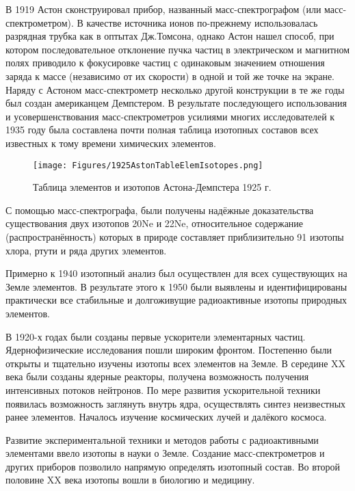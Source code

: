 \documentclass[a5paper,openany]{book}
\begin{document}
		В 1919 Астон сконструировал прибор, названный масс-спектрографом (или масс-спектрометром). В качестве источника ионов по-прежнему использовалась разрядная трубка как в оптытах Дж.Томсона, однако
		Астон нашел способ, при котором последовательное отклонение пучка частиц в электрическом и
		магнитном полях приводило к фокусировке частиц с одинаковым значением отношения заряда к массе
		(независимо от их скорости) в одной и той же точке на экране. Наряду с Астоном масс-спектрометр
		несколько другой конструкции в те же годы был создан американцем Демпстером. В результате
		последующего использования и усовершенствования масс-спектрометров усилиями многих
		исследователей к 1935 году была составлена почти полная таблица изотопных составов всех известных
		к тому времени химических элементов.
		
		\begin{figure}[ht] 
			\centering\small
			\unitlength=1mm
			\texttt{[image: Figures/1925AstonTableElemIsotopes.png]} 
			\caption{Таблица элементов и изотопов Астона-Демпстера 1925 г.} 
			\label{f:Aston1925}
		\end{figure}	
		
		
		С помощью масс-спектрографа, были получены надёжные доказательства существования двух
		изотопов 20Ne и
		22Ne, относительное содержание (распространённость) которых в природе составляет
		приблизительно 91%
		изотопы хлора, ртути и ряда других элементов. 
		
		Примерно к 1940 изотопный анализ был осуществлен
		для всех существующих на Земле элементов. В результате этого к 1950 были выявлены и
		идентифицированы практически все стабильные и долгоживущие радиоактивные изотопы природных
		элементов. 
		
		
		
		В 1920-х годах были созданы первые ускорители элементарных частиц.
		Ядернофизические исследования пошли широким фронтом. Постепенно были открыты и тщательно изучены изотопы всех элементов на Земле. 
		В середине XX века были созданы ядерные реакторы, получена возможность получения интенсивных потоков нейтронов. По мере развития ускорительной техники появилась возможность заглянуть внутрь ядра, осуществлять синтез неизвестных ранее элементов. Началось изучение космических лучей и далёкого космоса. 
		
		Развитие экспериментальной техники и методов работы с радиоактивными элементами ввело изотопы в науки о Земле. Создание масс-спектрометров и других приборов позволило напрямую определять изотопный состав. Во второй половине XX века изотопы вошли в биологию и медицину.
\end{document}
